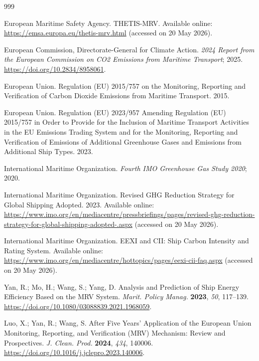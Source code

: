 \documentclass[preprints,article,submit,pdftex,oneauthor]{Definitions/mdpi}
\begin{document}
\begin{thebibliography}{999}

European Maritime Safety Agency. THETIS-MRV. Available online: \url{https://emsa.europa.eu/thetis-mrv.html} (accessed on 20 May 2026).

European Commission, Directorate-General for Climate Action. \textit{2024 Report from the European Commission on CO2 Emissions from Maritime Transport}; 2025. \url{https://doi.org/10.2834/8958061}.

European Union. Regulation (EU) 2015/757 on the Monitoring, Reporting and Verification of Carbon Dioxide Emissions from Maritime Transport. 2015.

European Union. Regulation (EU) 2023/957 Amending Regulation (EU) 2015/757 in Order to Provide for the Inclusion of Maritime Transport Activities in the EU Emissions Trading System and for the Monitoring, Reporting and Verification of Emissions of Additional Greenhouse Gases and Emissions from Additional Ship Types. 2023.

International Maritime Organization. \textit{Fourth IMO Greenhouse Gas Study 2020}; 2020.

International Maritime Organization. Revised GHG Reduction Strategy for Global Shipping Adopted. 2023. Available online: \url{https://www.imo.org/en/mediacentre/pressbriefings/pages/revised-ghg-reduction-strategy-for-global-shipping-adopted-.aspx} (accessed on 20 May 2026).

International Maritime Organization. EEXI and CII: Ship Carbon Intensity and Rating System. Available online: \url{https://www.imo.org/en/mediacentre/hottopics/pages/eexi-cii-faq.aspx} (accessed on 20 May 2026).

Yan, R.; Mo, H.; Wang, S.; Yang, D. Analysis and Prediction of Ship Energy Efficiency Based on the MRV System. \textit{Marit. Policy Manag.} \textbf{2023}, \textit{50}, 117--139. \url{https://doi.org/10.1080/03088839.2021.1968059}.

Luo, X.; Yan, R.; Wang, S. After Five Years' Application of the European Union Monitoring, Reporting, and Verification (MRV) Mechanism: Review and Prospectives. \textit{J. Clean. Prod.} \textbf{2024}, \textit{434}, 140006. \url{https://doi.org/10.1016/j.jclepro.2023.140006}.


\end{thebibliography}
\end{document}
